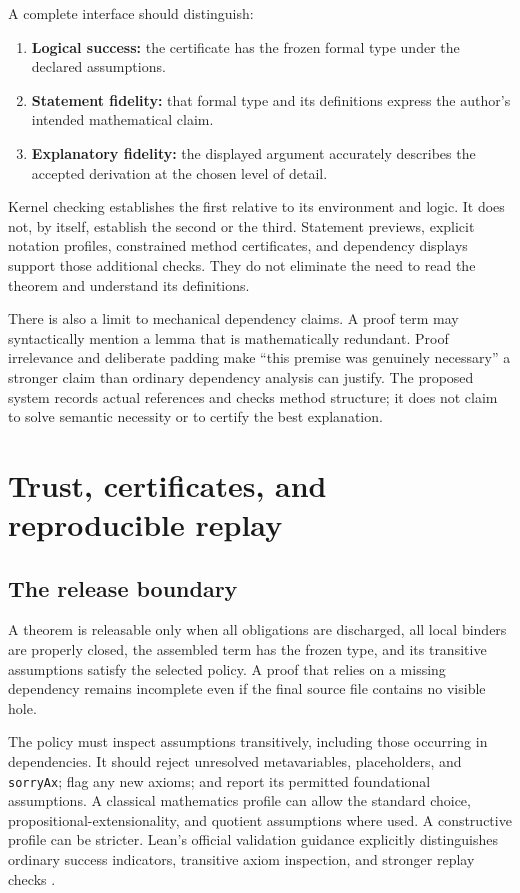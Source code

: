 \documentclass[11pt,a4paper]{article}
\newcommand{\codeid}[1]{\nolinkurl{#1}}
\begin{document}
A complete interface should distinguish:
\begin{enumerate}
\item \textbf{Logical success:} the certificate has the frozen formal type under the declared assumptions.
\item \textbf{Statement fidelity:} that formal type and its definitions express the author's intended mathematical claim.
\item \textbf{Explanatory fidelity:} the displayed argument accurately describes the accepted derivation at the chosen level of detail.
\end{enumerate}

Kernel checking establishes the first relative to its environment and logic. It does not, by itself, establish the second or the third. Statement previews, explicit notation profiles, constrained method certificates, and dependency displays support those additional checks. They do not eliminate the need to read the theorem and understand its definitions.

There is also a limit to mechanical dependency claims. A proof term may syntactically mention a lemma that is mathematically redundant. Proof irrelevance and deliberate padding make ``this premise was genuinely necessary'' a stronger claim than ordinary dependency analysis can justify. The proposed system records actual references and checks method structure; it does not claim to solve semantic necessity or to certify the best explanation.

\section{Trust, certificates, and reproducible replay}
\label{sec:trust}

\subsection{The release boundary}

A theorem is releasable only when all obligations are discharged, all local binders are properly closed, the assembled term has the frozen type, and its transitive assumptions satisfy the selected policy. A proof that relies on a missing dependency remains incomplete even if the final source file contains no visible hole.

The policy must inspect assumptions transitively, including those occurring in dependencies. It should reject unresolved metavariables, placeholders, and \codeid{sorryAx}; flag any new axioms; and report its permitted foundational assumptions. A classical mathematics profile can allow the standard choice, propositional-extensionality, and quotient assumptions where used. A constructive profile can be stricter. Lean's official validation guidance explicitly distinguishes ordinary success indicators, transitive axiom inspection, and stronger replay checks \cite{leanvalidation}.
\end{document}
